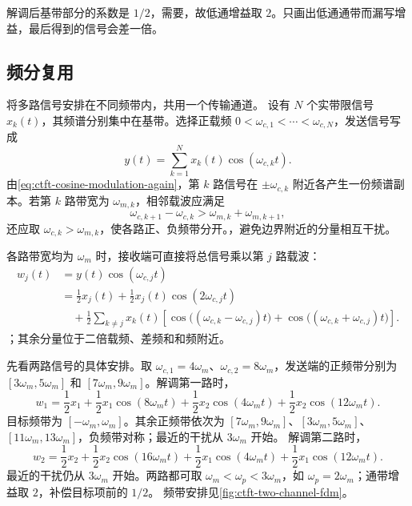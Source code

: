 \begin{pitfall}[解调后的低通增益]
  解调后基带部分的系数是 $1/2$，需要，故低通增益取 $2$。只画出低通通带而漏写增益，最后得到的信号会差一倍。
\end{pitfall}

\subsection{频分复用}

将多路信号安排在不同频带内，共用一个传输通道。
设有 $N$ 个实带限信号 $x_k(t)$，其频谱分别集中在基带。选择正载频
$0<\omega_{c,1}<\cdots<\omega_{c,N}$，发送信号写成
\begin{equation}
  y(t)=\sum_{k=1}^{N}x_k(t)\cos(\omega_{c,k}t).
  \label{eq:ctft-frequency-division-multiplexing}
\end{equation}
由\cref{eq:ctft-cosine-modulation-again}，第 $k$ 路信号在 $\pm\omega_{c,k}$ 附近各产生一份频谱副本。若第 $k$ 路带宽为 $\omega_{m,k}$，相邻载波应满足
\begin{equation}
  \omega_{c,k+1}-\omega_{c,k}
  >
  \omega_{m,k}+\omega_{m,k+1},
  \label{eq:ctft-fdm-separation}
\end{equation}
还应取 $\omega_{c,k}>\omega_{m,k}$，使各路正、负频带分开。，避免边界附近的分量相互干扰。

各路带宽均为 $\omega_m$ 时，接收端可直接将总信号乘以第 $j$ 路载波：
\begin{align*}
  w_j(t)
  &=y(t)\cos(\omega_{c,j}t)\\
  &=\frac12x_j(t)+\frac12x_j(t)\cos(2\omega_{c,j}t)\\
  &\quad+\frac12\sum_{k\ne j}x_k(t)
  \left[\cos\bigl((\omega_{c,k}-\omega_{c,j})t\bigr)
       +\cos\bigl((\omega_{c,k}+\omega_{c,j})t\bigr)\right].
\end{align*}
；其余分量位于二倍载频、差频和和频附近。

先看两路信号的具体安排。取 $\omega_{c,1}=4\omega_m$、$\omega_{c,2}=8\omega_m$，发送端的正频带分别为
$[3\omega_m,5\omega_m]$ 和 $[7\omega_m,9\omega_m]$。解调第一路时，
\[
  w_1=\frac12x_1+\frac12x_1\cos(8\omega_m t)
      +\frac12x_2\cos(4\omega_m t)
      +\frac12x_2\cos(12\omega_m t).
\]
目标频带为 $[-\omega_m,\omega_m]$。其余正频带依次为
$[7\omega_m,9\omega_m]$、$[3\omega_m,5\omega_m]$、
$[11\omega_m,13\omega_m]$，负频带对称；最近的干扰从 $3\omega_m$ 开始。
解调第二路时，
\[
  w_2=\frac12x_2+\frac12x_2\cos(16\omega_m t)
      +\frac12x_1\cos(4\omega_m t)
      +\frac12x_1\cos(12\omega_m t).
\]
最近的干扰仍从 $3\omega_m$ 开始。两路都可取 $\omega_m<\omega_p<3\omega_m$，如 $\omega_p=2\omega_m$；通带增益取 $2$，补偿目标项前的 $1/2$。
频带安排见\cref{fig:ctft-two-channel-fdm}。

